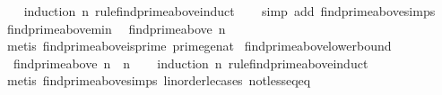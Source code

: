 \begin{isabellebody}
%
\isadelimproof
\ \ %
\endisadelimproof
%
\isatagproof
{}\isamarkupfalse%
\ {\isacharparenleft}{\kern0pt}induction\ n\ rule{\isacharcolon}{\kern0pt}find{\isacharunderscore}{\kern0pt}prime{\isacharunderscore}{\kern0pt}above{\isachardot}{\kern0pt}induct{\isacharparenright}{\kern0pt}\isanewline
\ \ \isamarkupfalse%
\ {\isacharparenleft}{\kern0pt}simp\ add{\isacharcolon}{\kern0pt}\ find{\isacharunderscore}{\kern0pt}prime{\isacharunderscore}{\kern0pt}above{\isachardot}{\kern0pt}simps{\isacharparenright}{\kern0pt}{\isacharplus}{\kern0pt}%
\endisatagproof
{\isafoldproof}%
%
\isadelimproof
\isanewline
%
\endisadelimproof
\isanewline
{}\isamarkupfalse%
\ find{\isacharunderscore}{\kern0pt}prime{\isacharunderscore}{\kern0pt}above{\isacharunderscore}{\kern0pt}min{\isacharcolon}{\kern0pt}\isanewline
\ \ {\isachardoublequoteopen}find{\isacharunderscore}{\kern0pt}prime{\isacharunderscore}{\kern0pt}above\ n\ {\isasymge}\ {}{\isachardoublequoteclose}\isanewline
%
\isadelimproof
\ \ %
\endisadelimproof
%
\isatagproof
{}\isamarkupfalse%
\ {\isacharparenleft}{\kern0pt}metis\ find{\isacharunderscore}{\kern0pt}prime{\isacharunderscore}{\kern0pt}above{\isacharunderscore}{\kern0pt}is{\isacharunderscore}{\kern0pt}prime\ prime{\isacharunderscore}{\kern0pt}ge{\isacharunderscore}{\kern0pt}{}{\isacharunderscore}{\kern0pt}nat{\isacharparenright}{\kern0pt}%
\endisatagproof
{\isafoldproof}%
%
\isadelimproof
\isanewline
%
\endisadelimproof
\isanewline
{}\isamarkupfalse%
\ find{\isacharunderscore}{\kern0pt}prime{\isacharunderscore}{\kern0pt}above{\isacharunderscore}{\kern0pt}lower{\isacharunderscore}{\kern0pt}bound{\isacharcolon}{\kern0pt}\isanewline
\ \ {\isachardoublequoteopen}find{\isacharunderscore}{\kern0pt}prime{\isacharunderscore}{\kern0pt}above\ n\ {\isasymge}\ n{\isachardoublequoteclose}\isanewline
%
\isadelimproof
\ \ %
\endisadelimproof
%
\isatagproof
{}\isamarkupfalse%
\ {\isacharparenleft}{\kern0pt}induction\ n\ rule{\isacharcolon}{\kern0pt}find{\isacharunderscore}{\kern0pt}prime{\isacharunderscore}{\kern0pt}above{\isachardot}{\kern0pt}induct{\isacharparenright}{\kern0pt}\isanewline
\ \ \isamarkupfalse%
\ {\isacharparenleft}{\kern0pt}metis\ find{\isacharunderscore}{\kern0pt}prime{\isacharunderscore}{\kern0pt}above{\isachardot}{\kern0pt}simps\ linorder{\isacharunderscore}{\kern0pt}le{\isacharunderscore}{\kern0pt}cases\ not{\isacharunderscore}{\kern0pt}less{\isacharunderscore}{\kern0pt}eq{\isacharunderscore}{\kern0pt}eq{\isacharparenright}{\kern0pt}%

\end{isabellebody}
